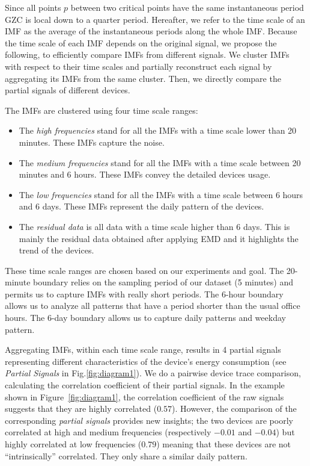 Since all points $p$ between two critical points have the same instantaneous period GZC is local down to a quarter period.
Hereafter, we refer to the time scale of an IMF as the average of the instantaneous periods along the whole IMF.
Because the time scale of each IMF depends on the original signal, we propose the following, to efficiently compare IMFs from different signals.
We cluster IMFs with respect to their time scales and partially reconstruct each signal by aggregating its IMFs from the 
same cluster.  Then, we directly compare the partial signals of different devices.

The IMFs are clustered using four time scale ranges: 
\begin{itemize}
 \item The \emph{high frequencies} stand for all the IMFs with a time scale lower than 20 minutes. These IMFs capture the noise.
 \item The \emph{medium frequencies} stand for all the IMFs with a time scale between 20 minutes and 6 hours. These IMFs convey the detailed devices usage.
 \item The \emph{low frequencies} stand for all the IMFs with a time scale between 6 hours and 6 days. These IMFs represent the daily pattern of the devices.
 \item The \emph{residual data} is all data with a time scale higher than 6 days. This is mainly the residual data obtained after applying EMD and it highlights the trend of the devices.
\end{itemize}

These time scale ranges are chosen based on our experiments and goal.
The 20-minute boundary relies on the sampling period of our dataset (5 minutes) and permits us to capture IMFs with really short periods.
The 6-hour boundary allows us to analyze all patterns that have a period shorter than the usual office hours.
The 6-day boundary allows us to capture daily patterns and weekday pattern.

Aggregating IMFs, within each time scale range, results in 4 partial signals representing different characteristics of the device's
 energy consumption (see \emph{Partial Signals} in Fig.\ref{fig:diagram1}).
We do a pairwise device trace comparison, calculating the correlation coefficient of their partial signals.
In the example shown in Figure~\ref{fig:diagram1}, the correlation coefficient of the raw signals suggests that they are highly correlated ($0.57$). 
However, the comparison of the corresponding \emph{partial signals} provides new insights;
the two devices are poorly correlated at high and medium frequencies (respectively $-0.01$ and $-0.04$) but highly correlated at low frequencies ($0.79$) meaning that these devices are not ``intrinsically'' correlated.  They only share a similar daily pattern.

